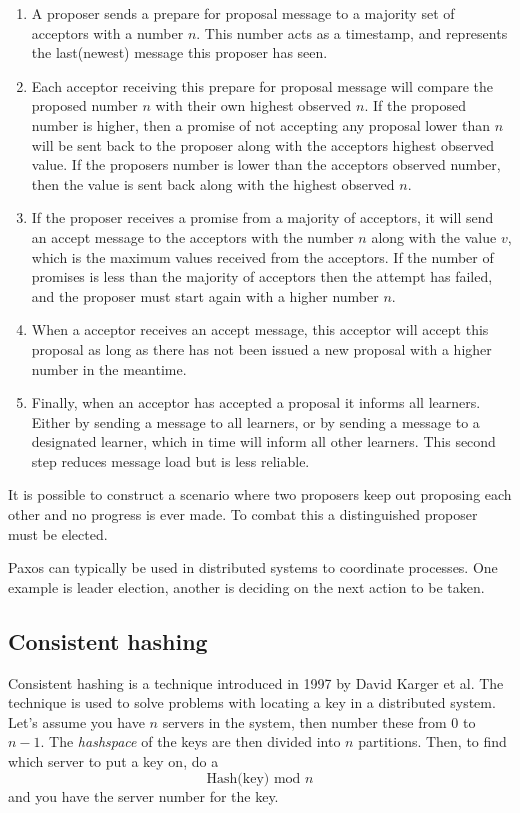 \begin{enumerate}

\item A proposer sends a prepare for proposal message to a majority set of acceptors with a number $n$. This number acts as a timestamp, and represents the last(newest) message this proposer has seen. 
\item Each acceptor receiving this prepare for proposal message will compare the proposed number $n$ with their own highest observed $n$. If the proposed number is higher, then a promise of not accepting any proposal lower than $n$ will be sent back to the proposer along with the acceptors highest observed value. If the proposers number is lower than the acceptors observed number, then the value is sent back along with the highest observed $n$.
\item If the proposer receives a promise from a majority of acceptors, it will send an accept message to the acceptors with the number $n$ along with the value $v$, which is the maximum values received from the acceptors. If the number of promises is less than the majority of acceptors then the attempt has failed, and the proposer must start again with a higher number $n$.
\item When a acceptor receives an accept message, this acceptor will accept this proposal as long as there has not been issued a new proposal with a higher number in the meantime. 
\item Finally, when an acceptor has accepted a proposal it informs all learners. Either by sending a message to all learners, or by sending a message to a designated learner, which in time will inform all other learners. This second step reduces message load but is less reliable.

\end{enumerate}

It is possible to construct a scenario where two proposers keep out proposing each other and no progress is ever made. To combat this a distinguished proposer must be elected. 

Paxos can typically be used in distributed systems to coordinate processes. One example is leader election, another is deciding on the next action to be taken.

\subsection{Consistent hashing}
\label{sec:consistenthashing}
Consistent hashing is a technique introduced in 1997 by David Karger\cite{Karger97consistenthashing} et al.
The technique is used to solve problems with locating a key in a distributed system.
Let's assume you have $n$ servers in the system, then number these from $0$ to $n-1$.
The \emph{hashspace} of the keys are then divided into $n$ partitions. Then, to find which server to put a key on, do a $$\textrm{Hash(key) mod } n$$ and you have the server number for the key. 

